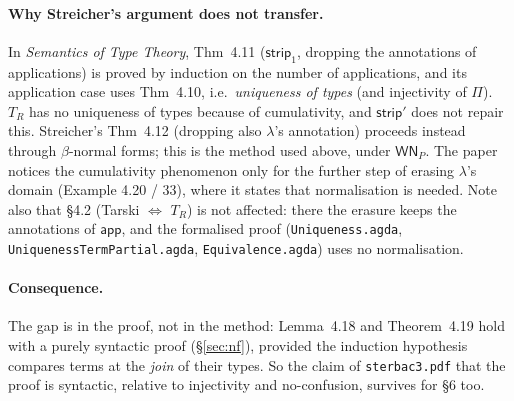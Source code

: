 \documentclass[10pt]{article}
\newcommand{\lam}{\lambda}
\newcommand{\app}{\mathsf{app}}
\newcommand{\strip}{\mathsf{strip}}
\newcommand{\TR}{T_R}
\newcommand{\WN}{\mathsf{WN}_P}
\newcommand{\agda}[1]{\texttt{#1}}
\theoremstyle{remark}
\begin{document}
\paragraph{Why Streicher's argument does not transfer.}  In
\emph{Semantics of Type Theory}, Thm~4.11 ($\mathsf{strip}_1$, dropping the
annotations of applications) is proved by induction on the number of
applications, and its application case uses Thm~4.10, i.e.\
\emph{uniqueness of types} (and injectivity of $\Pi$).  $\TR$ has no
uniqueness of types because of cumulativity, and $\strip'$ does not repair
this.  Streicher's Thm~4.12 (dropping also $\lam$'s annotation) proceeds
instead through $\beta$-normal forms; this is the method used above, under
$\WN$.  The paper notices the cumulativity phenomenon only for the further
step of erasing $\lam$'s domain (Example 4.20 / 33), where it states that
normalisation is needed.  Note also that §4.2 (Tarski $\Leftrightarrow$
$\TR$) is not affected: there the erasure keeps the annotations of $\app$,
and the formalised proof (\agda{Uniqueness.agda},
\agda{UniquenessTermPartial.agda}, \agda{Equivalence.agda}) uses no
normalisation.

\paragraph{Consequence.}  The gap is in the proof, not in the method:
Lemma~4.18 and Theorem~4.19 hold with a purely syntactic proof
(\S\ref{sec:nf}), provided the induction hypothesis compares terms at the
\emph{join} of their types.  So the claim of \texttt{sterbac3.pdf} that the
proof is syntactic, relative to injectivity and no-confusion, survives for
§6 too.

\end{document}
